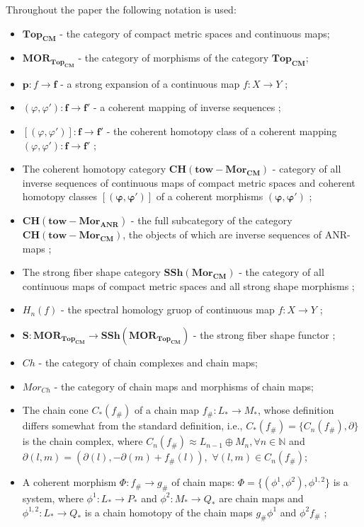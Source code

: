 \documentclass[10pt]{article}
\theoremstyle{definition}
\begin{document}
Throughout the paper the following notation is used:


\begin{itemize}
\item $\mathbf{Top_{CM}}$ - the category of compact metric spaces and continuous
maps;
\item $\mathbf{MO}{{\mathbf{R}}_{\mathbf{Top_{CM}}}}$ - the category of morphisms of the category $\mathbf{Top_{CM}}$;
\item $ \mathbf p :f\to \mathbf f$\textbf{ }- a strong expansion of a continuous map $f:X \to Y$ \cite{301};
\item $(\varphi ,{\varphi }'):\mathbf{f}\to \mathbf{f}'$ - a coherent mapping of inverse sequences \cite{301};
\item $[(\varphi ,{\varphi }')]:\mathbf{f}\to \mathbf{f}'$ - the coherent homotopy class of a coherent mapping $(\varphi ,{\varphi }'):\mathbf{f}\to \mathbf{f}'$ \cite{301};
\item The coherent homotopy category $\mathbf{CH}(\mathbf{tow}-\mathbf{Mo}{{\mathbf{r}}_{\mathbf{CM}}})$ - category of all inverse sequences of continuous maps of compact metric spaces and coherent homotopy classes $[(\mathbf{\varphi },\mathbf{{\varphi }'})]$ of a coherent morphisms $(\mathbf{\varphi },\mathbf{{\varphi }'})$ \cite{301};
\item  $\mathbf{CH}(\mathbf{tow}-\mathbf{Mo}{{\mathbf{r}}_{\mathbf{ANR}}})$ - the full subcategory of the category $\mathbf{CH}(\mathbf{tow}-\mathbf{Mo}{{\mathbf{r}}_{\mathbf{CM}}})$, the objects of which are inverse sequences of $\text{ANR}$-maps \cite{301};
\item The strong fiber shape category $\mathbf{SSh}(\mathbf{Mo}{{\mathbf{r}}_{\mathbf{CM}}})$ - the category of all continuous maps of compact metric spaces and all strong shape morphisms \cite{301};
\item $H_n(f)$ - the spectral homology gruop of continuous map $f:X \to Y$ \cite{18};
\item $\mathbf{S}:\mathbf{MO}{{\mathbf{R}}_{\mathbf{Top_{CM}}}}\to \mathbf{SSh}(\mathbf{MO}{{\mathbf{R}}_{\mathbf{Top_{CM}}}})$ - the strong fiber shape functor \cite{301};
\item $Ch$ - the category of chain complexes and chain maps;
\item $Mor_{Ch}$ - the category of chain maps and morphisms of chain
maps;
\item The chain cone $C_{*}(f_{\#})$  of a chain map $f_{\#}:L_{*}\to M_{*}$, whose definition differs somewhat from the standard definition, i.e., $C_{*}(f_{\#})=\lbrace C_{n}(f_{\#}),{\partial }\rbrace $ is the chain complex, where $C_{n}(f_{\#})\approx L_{n-1} \oplus M_{n}, \forall n \in \mathbb{N}$ and ${\partial}(l,m)=(\partial (l),-\partial (m)+f_{\#}(l)), $ $\forall (l,m)\in C_{n}(f_{\#})$;
\item A coherent morphism \textbf{ }$\Phi : f_{\#}\to g_{\#}$ of chain
maps: $\Phi =\lbrace (\phi ^{1},\phi ^{2}),\phi ^{1,2}\rbrace $ is
a system, where $\phi ^{1}:L_{*}\to P_{*}$ and $\phi ^{2}:M_{*}\to Q_{*}$ are chain maps and $\phi ^{1,2}:L_{*}\to Q_{*}$ is a chain homotopy of the chain maps $g_{\#}\phi ^{1}$ and $\phi ^{2}f_{\#}$ \cite{1901};


\end{itemize}
\end{document}

